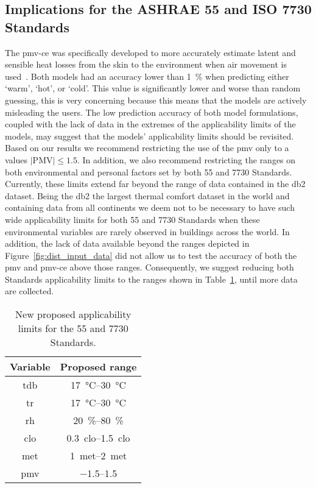 \subsection{Implications for the ASHRAE 55 and ISO 7730 Standards}\label{subsec:implications-for-the-ashrae-55-and-iso-7730-standards}
The \ac{pmv-ce} was specifically developed to more accurately estimate latent and sensible heat losses from the skin to the environment when air movement is used~\cite{arens_moving_2009}.
Both models had an accuracy lower than \qty{1}{\percent} when predicting either `warm', `hot', or `cold'.
This value is significantly lower and worse than random guessing, this is very concerning because this means that the models are actively misleading the users.
The low prediction accuracy of both model formulations, coupled with the lack of data in the extremes of the applicability limits of the models, may suggest that the models' applicability limits should be revisited.
Based on our results we recommend restricting the use of the \ac{pmv} only to a values $\lvert \textrm{PMV}\lvert \leq 1.5$.
In addition, we also recommend restricting the ranges on both environmental and personal factors set by both \gls{55} and \gls{7730} Standards.
Currently, these limits extend far beyond the range of data contained in the \ac{db2} dataset.
Being the \ac{db2} the largest thermal comfort dataset in the world and containing data from all continents we deem not to be necessary to have such wide applicability limits for both \gls{55} and \gls{7730} Standards when these environmental variables are rarely observed in buildings across the world.
In addition, the lack of data available beyond the ranges depicted in Figure~\ref{fig:dist_input_data} did not allow us to test the accuracy of both the \ac{pmv} and \ac{pmv-ce} above those ranges.
Consequently, we suggest reducing both Standards applicability limits to the ranges shown in Table~\ref{tab:ranges}, until more data are collected.
\begin{table}[htb!]
    \centering
    \begin{tabular}{cc}
        \toprule
        Variable & Proposed range \\
        \midrule
        \ac{tdb} & \qtyrange{17}{30}{\celsius} \\
        \ac{tr} & \qtyrange{17}{30}{\celsius} \\
        \ac{rh} & \qtyrange{20}{80}{\percent} \\
        \ac{clo} & \qtyrange{0.3}{1.5}{clo} \\
        \ac{met} & \qtyrange{1}{2}{met} \\
        \ac{pmv} & \qtyrange{-1.5}{1.5}{} \\
        \bottomrule
    \end{tabular}
    \caption{New proposed applicability limits for the \gls{55} and \gls{7730} Standards.}
    \label{tab:ranges}
\end{table}

